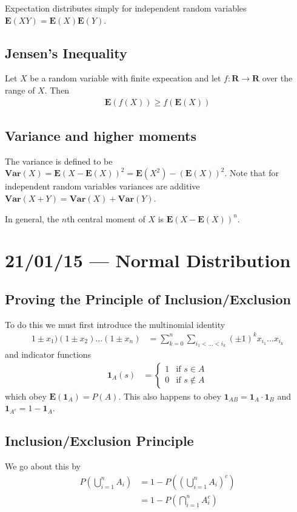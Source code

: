 \documentclass[10pt]{report}
\begin{document}
Expectation distributes simply for independent random variables $\mathbf{E}(XY) = \mathbf{E}(X)\mathbf{E}(Y)$.

\section{Jensen's Inequality}

Let $X$ be a random variable with finite expecation and let $f:\mathbf{R} \to \mathbf{R}$ over the range of $X$. Then
\begin{align}
    \mathbf{E}(f(X)) \geq f(\mathbf{E}(X))
\end{align}

\section{Variance and higher moments}

The variance is defined to be $\mathbf{Var}(X) = \mathbf{E}(X - \mathbf{E}(X))^2 = \mathbf{E}(X^2) - (\mathbf{E}(X))^2$. Note that for independent random variables variances are additive $\mathbf{Var}(X + Y) = \mathbf{Var}(X) + \mathbf{Var}(Y)$. 

In general, the $n$th central moment of $X$ is $\mathbf{E}\left( X - \mathbf{E}(X) \right)^n$. 

\chapter{21/01/15 --- Normal Distribution}

\section{Proving the Principle of Inclusion/Exclusion}

To do this we must first introduce the multinomial identity
\begin{align}
    1 \pm x_1)(1 \pm x_2)\dots (1 \pm x_n) &= \sum\limits_{k=0}^{n}\sum\limits_{i_1 <\dots  <i_k}^{}\left( \pm 1 \right)^k x_{i_1}\dots x_{i_k}
\end{align}
and indicator functions
\begin{align}
    \mathbf{1}_{A}(s) &= 
    \begin{cases}
        1 &\mbox{if } s \in A\\
        0 &\mbox{if } s \notin A
    \end{cases}
\end{align}
which obey $\mathbf{E}\left( \mathbf{1}_A \right) = P(A)$. This also happens to obey $\mathbf{1}_{AB} = \mathbf{1}_A \cdot \mathbf{1}_B$ and $\mathbf{1}_{A^c} = 1 - \mathbf{1}_A$.

\section{Inclusion/Exclusion Principle}

We go about this by
\begin{align}
    P\left( \bigcup_{i=1}^n A_i \right) &= 1 - P\left( \left( \bigcup_{i=1}^n A_i \right)^c \right)\\
    &= 1 - P\left( \bigcap_{i=1}^n A_i^c \right)
\end{align}
\end{document}
